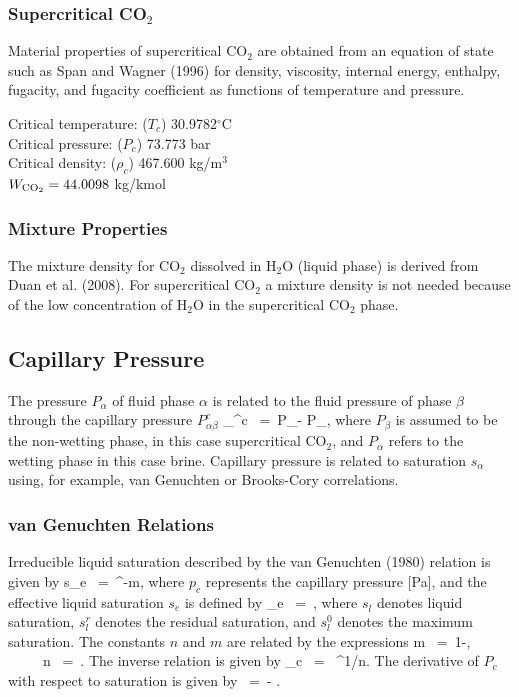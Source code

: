 \documentclass[12pt]{article}
\def\EQ#1\EN{\begin{equation}#1\end{equation}}
\newcommand{\eq}{\ =\ }
\newcommand{\degc}{$^\circ$C}
\renewcommand{\c}{{\rm CO_2}}
\renewcommand{\a}{{\alpha}}
\renewcommand{\b}{{\beta}}
\begin{document}
\subsubsection{Supercritical CO$_2$}

Material properties of supercritical CO$_2$ are obtained from an equation of state such as Span and Wagner (1996) for density, viscosity, internal energy, enthalpy, fugacity, and fugacity coefficient as functions of temperature and pressure.

\noindent
Critical temperature: ($T_c$) 30.9782\degc\\
Critical pressure: ($P_c$)	73.773 bar\\
Critical density: ($\rho_c$)	467.600 kg/m$^3$\\
$W_{\c} = 44.0098$ kg/kmol

\subsubsection{Mixture Properties}

The mixture density for CO$_2$ dissolved in H$_2$O (liquid phase) is derived from Duan et al. (2008). For supercritical CO$_2$ a mixture density is not needed because of the low concentration of H$_2$O in the supercritical CO$_2$ phase.

\subsection{Capillary Pressure}

The pressure $P_\a$ of fluid phase $\a$ is related to the fluid pressure of phase $\b$ through the capillary pressure $P_{\a\b}^c$
\EQ
P_{\a\b}^c \eq P_\b - P_\a,
\EN
where $P_\b$ is assumed to be the non-wetting phase, in this case supercritical CO$_2$, and $P_\a$ refers to the wetting phase in this case brine. Capillary pressure is related to saturation $s_\a$ using, for example, van Genuchten or Brooks-Cory correlations.

\subsubsection{van Genuchten Relations}

Irreducible liquid saturation described by the van Genuchten (1980) relation is given by
\EQ\label{seff}
s_e \eq {}^{-m}, 
\EN 
where $p_c$ represents the capillary pressure [Pa], and the effective liquid saturation $s_e$ is defined by 
\EQ 
s_e \eq {}, 
\EN 
where $s_l^{}$ denotes liquid saturation, $s_l^r$ denotes the residual saturation, and $s_l^0$ denotes the maximum saturation. The constants $n$ and $m$ are related by the expressions 
\EQ\label{lambda} 
m \eq 1-, \ \ \ \ \ n \eq {}. 
\EN 
The inverse relation is given by
\EQ
P_c \eq {} ^{1/n}.
\EN
The derivative of $P_c$ with respect to saturation is given by
\EQ
\frac{dP_c}{ds_e} \eq - .
\EN
\end{document}
